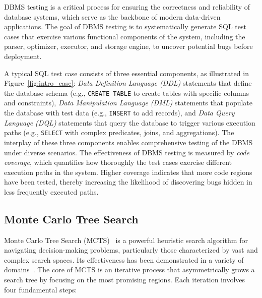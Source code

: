 DBMS testing is a critical process for ensuring the correctness and reliability of database systems, which serve as the backbone of modern data-driven applications. The goal of DBMS testing is to systematically generate SQL test cases that exercise various functional components of the system, including the parser, optimizer, executor, and storage engine, to uncover potential bugs before deployment. 

A typical SQL test case consists of three essential components, as illustrated in Figure~\ref{fig:intro_case}: \textit{Data Definition Language (DDL)} statements that define the database schema (e.g., \texttt{CREATE TABLE} to create tables with specific columns and constraints), \textit{Data Manipulation Language (DML)} statements that populate the database with test data (e.g., \texttt{INSERT} to add records), and \textit{Data Query Language (DQL)} statements that query the database to trigger various execution paths (e.g., \texttt{SELECT} with complex predicates, joins, and aggregations). The interplay of these three components enables comprehensive testing of the DBMS under diverse scenarios. The effectiveness of DBMS testing is measured by \textit{code coverage}, which quantifies how thoroughly the test cases exercise different execution paths in the system. Higher coverage indicates that more code regions have been tested, thereby increasing the likelihood of discovering bugs hidden in less frequently executed paths.

\subsection{Monte Carlo Tree Search}

Monte Carlo Tree Search (MCTS)~\cite{kocsis2006bandit} is a powerful heuristic search algorithm for navigating decision-making problems, particularly those characterized by vast and complex search spaces. Its effectiveness has been demonstrated in a variety of domains~\cite{swiechowski2023monte,zhou2021learned,kartal2019action}. The core of MCTS is an iterative process that asymmetrically grows a search tree by focusing on the most promising regions. Each iteration involves four fundamental steps:

